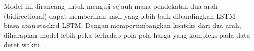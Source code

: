 Model ini dirancang untuk menguji sejauh mana pendekatan dua arah (bidirectional) dapat memberikan hasil yang lebih baik dibandingkan LSTM biasa atau stacked LSTM. Dengan mempertimbangkan konteks dari dua arah, diharapkan model lebih peka terhadap pola-pola harga yang kompleks pada data deret waktu.






